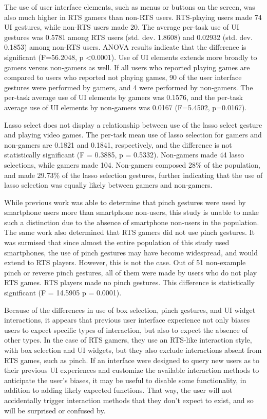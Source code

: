 The use of user interface elements, such as menus or buttons on the screen, was also much higher in RTS gamers than non-RTS users. 
RTS-playing users made 74 UI gestures, while non-RTS users made 20. 
The average per-task use of UI gestures was 0.5781 among RTS users (std. dev. 1.8608) and 0.02932 (std. dev. 0.1853) among non-RTS users. 
ANOVA results indicate that the difference is significant (F=56.2048, p \textless 0.0001).
Use of UI elements extends more broadly to gamers versus non-gamers as well. 
If all users who reported playing games are compared to users who reported not playing games, 90 of the user interface gestures were performed by gamers, and 4 were performed by non-gamers. 
The per-task average use of UI elements by gamers was 0.1576, and the per-task average use of UI elements by non-gamers was 0.0167 (F=5.4502, p=0.0167).

Lasso select does not display a relationship between use of the lasso select gesture and playing video games. 
The per-task mean use of lasso selection for gamers and non-gamers are 0.1821 and 0.1841, respectively, and the difference is not statistically significant (F = 0.3885, p = 0.5332).
Non-gamers made 44 lasso selections, while gamers made 104.
Non-gamers composed 28\% of the population, and made 29.73\% of the lasso selection gestures, further indicating that the use of lasso selection was equally likely between gamers and non-gamers. 

While previous work was able to determine that pinch gestures were used by smartphone users more than smartphone non-users, this study is unable to make such a distinction due to the absence of smartphone non-users in the population.  
The same work also determined that RTS gamers did not use pinch gestures.
It was surmised that since almost the entire population of this study used smartphones, the use of pinch gestures may have become widespread, and would extend to RTS players. 
However, this is not the case. 
Out of 51 non-example pinch or reverse pinch gestures, all of them were made by users who do not play RTS games.
RTS players made no pinch gestures.
This difference is statistically significant (F = 14.5905 p = 0.0001).

Because of the differences in use of box selection, pinch gestures, and UI widget interactions, it appears that previous user interface experience not only biases users to expect specific types of interaction, but also to expect the absence of other types. 
In the case of RTS gamers, they use an RTS-like interaction style, with box selection and UI widgets, but they also exclude interactions absent from RTS games, such as pinch. 
If an interface were designed to query new users as to their previous UI experiences and customize the available interaction methods to anticipate the user's biases, it may be useful to disable some functionality, in addition to adding likely expected functions. 
That way, the user will not accidentally trigger interaction methods that they don't expect to exist, and so will be surprised or confused by. 

